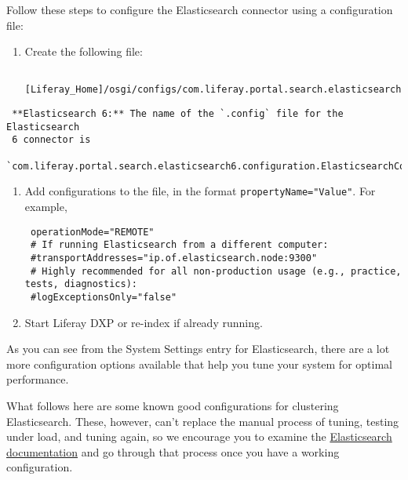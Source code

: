 Follow these steps to configure the Elasticsearch connector using a
configuration file:

\begin{enumerate}
\def\labelenumi{\arabic{enumi}.}
\item
  Create the following file:

\begin{verbatim}
 [Liferay_Home]/osgi/configs/com.liferay.portal.search.elasticsearch7.configuration.ElasticsearchConfiguration.config
\end{verbatim}
\end{enumerate}

\noindent\hrulefill

\begin{verbatim}
 **Elasticsearch 6:** The name of the `.config` file for the Elasticsearch
 6 connector is
 `com.liferay.portal.search.elasticsearch6.configuration.ElasticsearchConfiguration.config`
\end{verbatim}

\noindent\hrulefill

\begin{enumerate}
\def\labelenumi{\arabic{enumi}.}
\setcounter{enumi}{1}
\item
  Add configurations to the file, in the format
  \texttt{propertyName="Value"}. For example,

\begin{verbatim}
 operationMode="REMOTE"
 # If running Elasticsearch from a different computer:
 #transportAddresses="ip.of.elasticsearch.node:9300"
 # Highly recommended for all non-production usage (e.g., practice, tests, diagnostics):
 #logExceptionsOnly="false"
\end{verbatim}
\item
  Start Liferay DXP or re-index if already running.
\end{enumerate}

As you can see from the System Settings entry for Elasticsearch, there
are a lot more configuration options available that help you tune your
system for optimal performance.

What follows here are some known good configurations for clustering
Elasticsearch. These, however, can't replace the manual process of
tuning, testing under load, and tuning again, so we encourage you to
examine the
\href{https://www.elastic.co/guide/en/elasticsearch/reference/7.x/important-settings.html}{Elasticsearch
documentation} and go through that process once you have a working
configuration.

